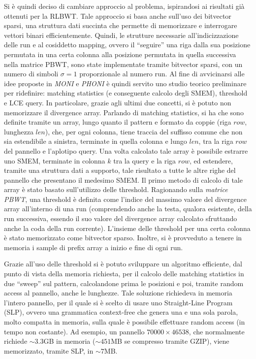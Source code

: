 \documentclass[a4paper,11pt, oneside,italian]{article}
\begin{document}
Si è quindi deciso di cambiare approccio al problema, ispirandosi ai risultati
già ottenuti per la RLBWT. Tale approccio si basa anche sull'uso dei bitvector
sparsi, una struttura dati succinta che permette di memorizzare e interrogare
vettori binari efficientemente.
Quindi, le strutture necessarie all'indicizzazione delle run e al cosiddetto
mapping, ovvero il ``seguire'' una riga dalla sua posizione permutata in una
certa colonna alla posizione permutata in quella successiva nella matrice PBWT,
sono state implementate tramite bitvector sparsi, con un numero di simboli
$\sigma=1$ proporzionale al numero run.
Al fine di avvicinarsi alle idee proposte in \textit{MONI} e \textit{PHONI} è
quindi servito uno studio teorico preliminare per ridefinire: matching
statistics (e conseguente calcolo degli SMEM), threshold e LCE query. In
particolare, grazie agli  
ultimi due concetti, si è potuto non memorizzare il divergence array.
Parlando di matching statistics, si ha che sono definite tramite un array, lungo
quanto il pattern e formato da coppie (riga $row$, lunghezza $len$), che, per
ogni colonna, tiene traccia del suffisso comune che non sia estendibile a
sinistra, terminate in quella colonna e lungo $len$, tra la riga $row$ del
pannello e l'aplotipo query. Una volta calcolato tale
array è possibile estrarre uno SMEM, terminate in colonna $k$ tra la query e la
riga $row$, ed estendere, tramite una struttura dati a supporto, tale risultato
a tutte le altre righe del pannello che presentano il medesimo SMEM.
Il primo metodo di calcolo di tale array è stato basato sull'utilizzo delle
threshold. Ragionando sulla \textit{matrice PBWT}, una threshold è definita
come l'indice del massimo valore del divergence array all'interno di una run
(comprendendo anche la testa, qualora esistente, della run successiva, essendo
il suo valore del divergence array calcolato sfruttando anche la coda della run
corrente). L'insieme delle threshold per una certa colonna è stato memorizzato
come bitvector sparso. Inoltre, si è provveduto a tenere in memoria i
sample di prefix array a inizio e fine di ogni run.

Grazie all'uso delle threshold si è potuto sviluppare un algoritmo
efficiente, dal punto di vista della memoria richiesta, per il calcolo delle
matching statistics in due ``sweep'' sul pattern, calcolandone prima le
posizioni e poi, tramite random access al pannello, anche le
lunghezze. Tale soluzione richiedeva in memoria l'intero pannello, per il quale
si è scelto di usare uno Straight-Line Program (SLP), ovvero una grammatica
context-free che genera una e una sola parola, molto compatta in memoria, sulla
quale è possibile effettuare random access (in tempo non costante). Ad esempio,
un pannello $70000 \times 46538$, che normalmente richiede $\sim 3.3$GB in
memoria ($\sim 451$MB se compresso tramite GZIP), viene memorizzato, tramite
SLP, in $\sim 7$MB.
\end{document}
